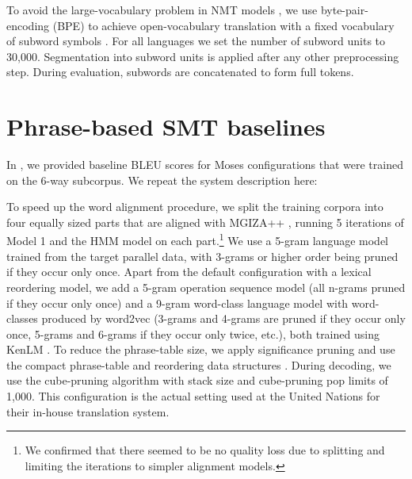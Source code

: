 \documentclass[11pt]{article}
\begin{document}
To avoid the large-vocabulary problem in NMT models \cite{44929}, we use byte-pair-encoding (BPE) to achieve open-vocabulary translation with a fixed vocabulary of subword symbols \cite{DBLP:journals/corr/SennrichHB15}. For all languages we set the number of subword units to 30,000. Segmentation into subword units is applied after any other preprocessing step. During evaluation, subwords are concatenated to form full tokens. 

\section{Phrase-based SMT baselines}
\label{pbmtbaselines}
In \cite{ZIEMSKI16.1195}, we provided baseline BLEU scores for Moses \cite{Koehn:2007:MOS:1557769.1557821} configurations that were trained on the 6-way subcorpus. We repeat the system description here:

To speed up the word alignment procedure, we split the training corpora into four equally sized parts that are aligned with MGIZA++ \cite{Gao:2008:PIW:1622110.1622119}, running 5 iterations of Model 1 and the HMM model on each part.\footnote{We confirmed that there seemed to be no quality loss due to splitting and limiting the iterations to simpler alignment models.}
We use a 5-gram language model trained from the target parallel data, with 3-grams or higher order being pruned if they occur only once. Apart from the default configuration with a lexical reordering model, we add a 5-gram operation sequence model \cite{conf/acl/DurraniFSHK13} (all n-grams pruned if they occur only once) and a 9-gram word-class language model with word-classes produced by word2vec \cite{journals/corr/abs-1301-3781} (3-grams and 4-grams are pruned if they occur only once, 5-grams and 6-grams if they occur only twice, etc.), both trained using KenLM \cite{Heafield-estimate}.  To reduce the phrase-table size, we apply significance pruning \cite{Johnson07improvingtranslation} and use the compact phrase-table and reordering data structures \cite{junczys_mtm_2012}.
During decoding, we use the cube-pruning algorithm with stack size and cube-pruning pop limits of 1,000. This configuration is the actual setting used at the United Nations for their in-house translation system.
\end{document}
